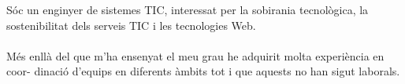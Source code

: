 \documentclass[9pt]{developercv} %
\begin{document}
\vspace{0.5cm}



\begin{minipage}[t]{0.4\textwidth} %
	\vspace{-\baselineskip} %
	Sóc un enginyer de sistemes
	TIC, interessat per la sobirania tecnològica, la
	sostenibilitat dels serveis TIC i les tecnologies
	Web.
	\\
	\\
	Més enllà del que m’ha ensenyat el meu
	grau he adquirit molta experiència en coor-
	dinació d’equips en diferents àmbits tot i que
	aquests no han sigut laborals.
\end{minipage}
\hfill %
\begin{minipage}[t]{0.5\textwidth} %
	\vspace{-\baselineskip} %
	\begin{barchart}{5.5}
	\end{barchart}
\end{minipage}


\end{document}
